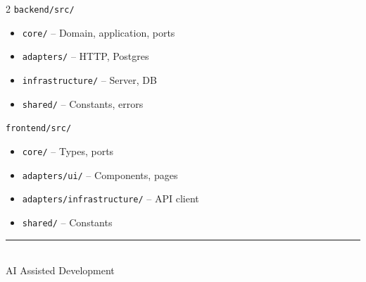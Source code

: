 \documentclass[10pt,a4paper]{article}
\begin{document}
\begin{multicols}{2}
\small
\texttt{backend/src/}
\begin{itemize}[leftmargin=1em,itemsep=0em,topsep=0em]
    \item \texttt{core/} -- Domain, application, ports
    \item \texttt{adapters/} -- HTTP, Postgres
    \item \texttt{infrastructure/} -- Server, DB
    \item \texttt{shared/} -- Constants, errors
\end{itemize}

\columnbreak

\texttt{frontend/src/}
\begin{itemize}[leftmargin=1em,itemsep=0em,topsep=0em]
    \item \texttt{core/} -- Types, ports
    \item \texttt{adapters/ui/} -- Components, pages
    \item \texttt{adapters/infrastructure/} -- API client
    \item \texttt{shared/} -- Constants
\end{itemize}
\end{multicols}

\vspace{0.6em}
\begin{center}
\textcolor{lightgray}{\rule{0.35\textwidth}{0.3pt}}\\[0.3em]
{\footnotesize\color{lightgray} AI Assisted Development}
\end{center}
\end{document}
